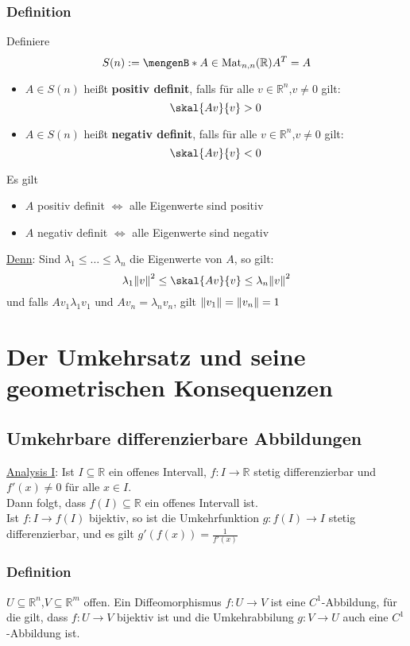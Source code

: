 \subsubsection{Definition} %
\label{ssub:definition}
Definiere 
\[
	S(n):= \set[A \in \Mat_{n,n}(\mathbb{R})]{A^T=A}
\]
\begin{itemize}
	\item $A \in S(n)$ heißt {\bfseries positiv definit}, falls für alle $v \in \mathbb{R}^n$,$v \neq 0$ gilt:
	\[
		\skal{Av}{v}>0
	\]
	\item $A \in S(n)$ heißt {\bfseries negativ definit}, falls für alle $v \in \mathbb{R}^n$,$v \neq 0$ gilt:
	\[
		\skal{Av}{v}<0
	\]
\end{itemize}
 Es gilt
\begin{itemize}
	\item $A$ positiv definit $\Leftrightarrow$ alle Eigenwerte sind positiv
	\item $A$ negativ definit $\Leftrightarrow$ alle Eigenwerte sind negativ
\end{itemize}
\underline{Denn}: Sind $\lambda_1 \leq \dots \leq \lambda_n$ die Eigenwerte von $A$, so gilt:
\[
	\lambda_1 \norm{v}^2 \leq  \skal{Av}{v} \leq \lambda_n \norm{v}^2
\]
und falls $Av_1  \lambda_1 v_1$ und $Av_n=\lambda_n v_n$, gilt $\norm{v_1}=\norm{v_n}=1$
\newpage
\section{Der Umkehrsatz und seine geometrischen Konsequenzen} %
\label{sec:der_umk}
\subsection{Umkehrbare differenzierbare Abbildungen} %
\label{sub:umkehrbare_differenzierbare_abbildungen}
\underline{Analysis I}:
Ist $I \subseteq \mathbb{R}$ ein offenes Intervall, $f: I \to \mathbb{R}$ stetig differenzierbar und $f'(x)\neq 0$ für alle $x \in I$. \\
Dann folgt, dass $f(I) \subseteq \mathbb{R}$ ein offenes Intervall ist. \\
Ist $f : I \to f(I)$ bijektiv, so ist die Umkehrfunktion $g: f(I) \to I$ stetig differenzierbar, und es gilt $g'(f(x))= \frac{1}{f'(x)}$

\subsubsection{Definition} %
\label{ssub:definition}
$ U \subseteq \mathbb{R}^n$,$V \subseteq \mathbb{R}^m$ offen. Ein Diffeomorphismus $f: U \to V$ ist eine $C^1$-Abbildung, für die gilt, dass $f:U \to V$ bijektiv ist und die Umkehrabbilung $g:V \to U$ auch eine $C^1$-Abbildung ist.
